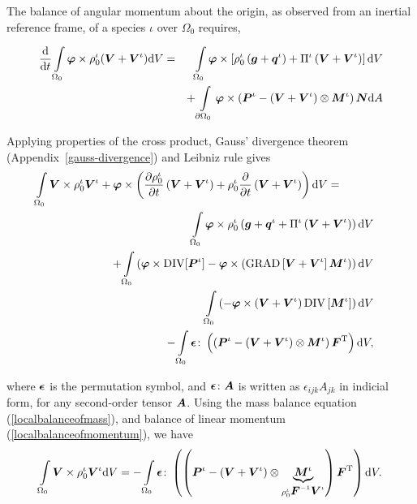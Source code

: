 The balance of angular momentum about the origin, as observed from an
inertial reference frame, of a species $\iota$ over $\Omega_{0}$
requires,

\begin{eqnarray}
\frac{\mathrm{d}}{\mathrm{d}t} \int\limits_{\Omega_0} \mbox{\boldmath$\varphi$}
\times \rho^\iota_0(\mbox{\boldmath$ V$}+\mbox{\boldmath$ V$}^\iota)\mathrm{d}V &=&
\int\limits_{\Omega_0}\mbox{\boldmath$\varphi$}\times\left
           [\rho^\iota_0\left(\mbox{\boldmath$ g$}+\mbox{\boldmath$ q$}^\iota\right) +
             \Pi^\iota\left(\mbox{\boldmath$ V$}+\mbox{\boldmath$ V$}^\iota\right)\right]\mathrm{d}V
           \nonumber\\  & &+
\int\limits_{\partial\Omega_0}\mbox{\boldmath$\varphi$}\times\left(\mbox{\boldmath$ P$}^\iota -
\left(\mbox{\boldmath$ V$}+\mbox{\boldmath$ V$}^\iota\right)\otimes\mbox{\boldmath$ M$}^\iota\right)\mbox{\boldmath$ N$}
\mathrm{d}A
\label{globalbalanceofangularmomentum}
\end{eqnarray}

\noindent Applying properties of the cross product, Gauss' divergence 
theorem (Appendix~\ref{gauss-divergence}) and Leibniz rule gives
\begin{eqnarray}
\int\limits_{\Omega_0}\mbox{\boldmath$ V$}\times\rho^\iota_0\mbox{\boldmath$ V$}^\iota +
\mbox{\boldmath$\varphi$}\times \left(\frac{\partial\rho^\iota_0}{\partial
t}\left(\mbox{\boldmath$ V$}+\mbox{\boldmath$ V$}^\iota\right)+ \rho^\iota_0\frac{\partial}{\partial
t}\left(\mbox{\boldmath$ V$}+\mbox{\boldmath$ V$}^\iota\right)\right)\mathrm{d}V =\qquad\quad& &\nonumber\\
\int\limits_{\Omega_0}\mbox{\boldmath$\varphi$}\times\rho^\iota_0
\left(\mbox{\boldmath$ g$}+\mbox{\boldmath$ q$}^\iota+\Pi^\iota\left(\mbox{\boldmath$ V$}+\mbox{\boldmath$ V$}^\iota\right)\right)\mathrm{d}V&
&\nonumber\\ 
 +
\int\limits_{\Omega_0}\left(\mbox{\boldmath$\varphi$}\times\mathrm{\small{DIV}}[\mbox{\boldmath$ P$}^\iota] -
\mbox{\boldmath$\varphi$}\times\left(\mathrm{\small{GRAD}}
\left[\mbox{\boldmath$ V$}+\mbox{\boldmath$ V$}^\iota\right]\mbox{\boldmath$ M$}^\iota\right)\right)\mathrm{d}V &
&\nonumber\\
\int\limits_{\Omega_0}\left(-\mbox{\boldmath$\varphi$}\times\left(\mbox{\boldmath$ V$}+\mbox{\boldmath$ V$}^\iota\right)
\mathrm{\small{DIV}}\left[\mbox{\boldmath$ M$}^\iota\right]\right) 
\mathrm{d}V & &\nonumber\\
-
\int\limits_{\Omega_0}\mbox{\boldmath$\epsilon$}\colon\left(\left(\mbox{\boldmath$ P$}^\iota -
\left(\mbox{\boldmath$ V$}+\mbox{\boldmath$ V$}^\iota\right)\otimes\mbox{\boldmath$ M$}^\iota\right)\mbox{\boldmath$ F$}^\mathrm{T}\right)\mathrm{d}V,
\end{eqnarray}

\noindent where $\mbox{\boldmath$\epsilon$}$ is the permutation symbol, and
$\mbox{\boldmath$\epsilon$}\colon\mbox{\boldmath$ A$}$ is written as $\epsilon_{ijk}A_{jk}$ in
indicial form, for any second-order tensor $\mbox{\boldmath$ A$}$. Using the mass
balance equation (\ref{localbalanceofmass}), and balance of linear
momentum (\ref{localbalanceofmomentum}), we have
\begin{displaymath}
\int\limits_{\Omega_0}\mbox{\boldmath$ V$}\times\rho^\iota_0\mbox{\boldmath$ V$}^\iota\mathrm{d}V =
-\int\limits_{\Omega_0}\mbox{\boldmath$\epsilon$}\colon
\left(\left(\mbox{\boldmath$ P$}^\iota-\left(\mbox{\boldmath$ V$}+\mbox{\boldmath$ V$}^\iota\right)
\otimes\underbrace{\mbox{\boldmath$ M$}^\iota}_{\rho_0^\iota\mbox{\boldmath$ F$}^{-1}\mbox{\boldmath$ V$}^\iota}\right)
\mbox{\boldmath$ F$}^\mathrm{T}\right)\mathrm{d}V. 
\end{displaymath}

